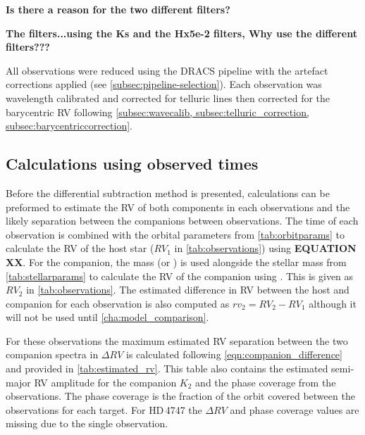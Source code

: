 \textbf{Is there a reason for the two different filters?}



\textbf{The filters...using the {Ks} and the {Hx5e-2} filters, Why use the different filters???}

All observations were reduced using the {DRACS} pipeline with the artefact corrections applied (see \cref{subsec:pipeline-selection}).
Each observation was wavelength calibrated and corrected for telluric lines then corrected for the barycentric RV following  \cref{subsec:wavecalib, subsec:telluric_correction, subsec:barycentriccorrection}.


\subsection{Calculations using observed times}
{\red{}
Before the differential subtraction method is presented, calculations can be preformed to estimate the RV of both components in each observations and the likely separation between the companions between observations.
The time of each observation is combined with the orbital parameters from \cref{tab:orbitparams} to calculate the RV of the host star (\({RV}_{1}\) in \cref{tab:observations}) using \textbf{EQUATION XX}.
For the companion, the mass (\Mtwo or \Mtwosini{})  is used alongside the stellar mass from \cref{tab:stellarparams} to calculate the RV of the companion using .
This is given as \({RV}_{2}\) in \cref{tab:observations}.
The estimated difference in RV between the host and companion for each observation is also computed as \({rv}_{2} = {RV}_{2}-{RV}_{1}\) although it will not be used until \cref{cha:model_comparison}.

For these observations the maximum estimated RV separation between the two companion spectra in  \(\Delta RV\) is calculated following \cref{eqn:companion_difference} and provided in \cref{tab:estimated_rv}.
This table also contains the estimated semi-major RV amplitude for the companion \(K_2\) and the phase coverage from the observations.
The phase coverage is the fraction of the orbit covered between the observations for each target.
For {HD\,4747} the \(\Delta RV\) and phase coverage values are missing due to the single observation.
}



